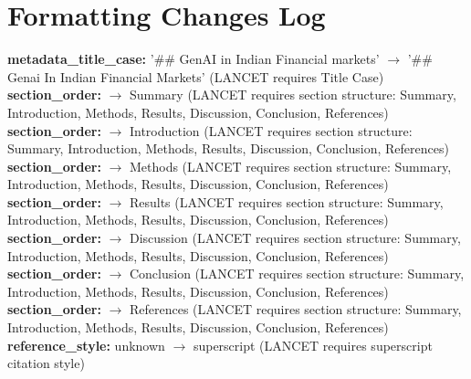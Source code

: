 \documentclass[11pt]{article}
\begin{document}
\section*{Formatting Changes Log}
\textbf{metadata_title_case:} '## GenAI in Indian Financial markets' $\rightarrow$ '## Genai In Indian Financial Markets' (LANCET requires Title Case) \\
\textbf{section_order:}  $\rightarrow$ Summary (LANCET requires section structure: Summary, Introduction, Methods, Results, Discussion, Conclusion, References) \\
\textbf{section_order:}  $\rightarrow$ Introduction (LANCET requires section structure: Summary, Introduction, Methods, Results, Discussion, Conclusion, References) \\
\textbf{section_order:}  $\rightarrow$ Methods (LANCET requires section structure: Summary, Introduction, Methods, Results, Discussion, Conclusion, References) \\
\textbf{section_order:}  $\rightarrow$ Results (LANCET requires section structure: Summary, Introduction, Methods, Results, Discussion, Conclusion, References) \\
\textbf{section_order:}  $\rightarrow$ Discussion (LANCET requires section structure: Summary, Introduction, Methods, Results, Discussion, Conclusion, References) \\
\textbf{section_order:}  $\rightarrow$ Conclusion (LANCET requires section structure: Summary, Introduction, Methods, Results, Discussion, Conclusion, References) \\
\textbf{section_order:}  $\rightarrow$ References (LANCET requires section structure: Summary, Introduction, Methods, Results, Discussion, Conclusion, References) \\
\textbf{reference_style:} unknown $\rightarrow$ superscript (LANCET requires superscript citation style) \\
\end{document}
